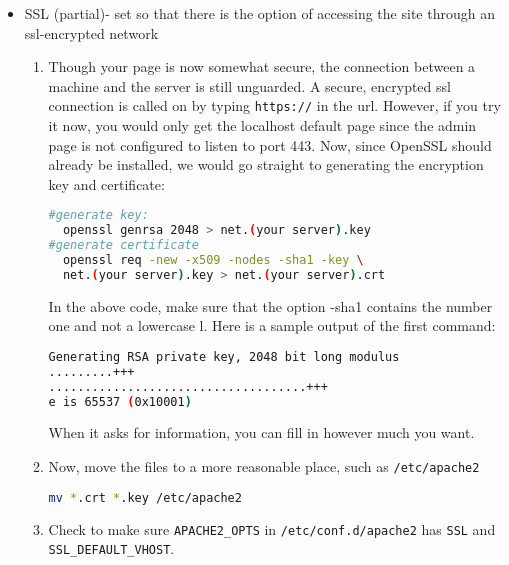 \documentclass[11pt]{article}
\begin{document}
\begin {itemize}
\begin{enumerate}
  \end{enumerate}
  
  \item SSL (partial)- set so that there is the option of accessing the site through an ssl-encrypted network
  \begin{enumerate}
  
    \item Though your page is now somewhat secure, the connection between a machine and the server is still unguarded. A secure, encrypted ssl connection is called on by typing \verb|https://| in the url. However, if you try it now, you would only get the localhost default page since the admin page is not configured to listen to port 443. Now, since OpenSSL should already be installed, we would go straight to generating the encryption key and certificate:
    \begin{lstlisting}[basicstyle=\ttfamily, backgroundcolor = \color{lightgray}, language = bash, xleftmargin = 0cm, framexleftmargin = 1em, framexrightmargin = 6em, showstringspaces=false] 
#generate key:
  openssl genrsa 2048 > net.(your server).key
#generate certificate
  openssl req -new -x509 -nodes -sha1 -key \
  net.(your server).key > net.(your server).crt
\end{lstlisting}

In the above code, make sure that the option -sha1 contains the number one and not a lowercase l. Here is a sample output of the first command:

  \begin{lstlisting}[basicstyle=\ttfamily, backgroundcolor = \color{lightgray}, language = bash, xleftmargin = 0cm, framexleftmargin = 1em, framexrightmargin = 6em, showstringspaces=false] 
Generating RSA private key, 2048 bit long modulus
.........+++
....................................+++
e is 65537 (0x10001)
\end{lstlisting}
   When it asks for information, you can fill in however much you want.
    
    \item Now, move the files to a more reasonable place, such as \verb|/etc/apache2|
    \begin{lstlisting}[basicstyle=\ttfamily, backgroundcolor = \color{lightgray}, language = bash, xleftmargin = 0cm, framexleftmargin = 1em, framexrightmargin = 6em, showstringspaces=false] 
mv *.crt *.key /etc/apache2
\end{lstlisting}

    \item Check to make sure \verb|APACHE2_OPTS| in \verb|/etc/conf.d/apache2| has \verb|SSL| and \verb|SSL_DEFAULT_VHOST|.
    

\end{enumerate}
\end{itemize}
\end{document}
